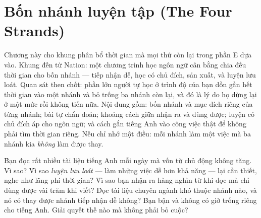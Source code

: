 \documentclass[../../english.tex]{subfiles}
\begin{document}
\chapter{Bốn nhánh luyện tập (The Four Strands)}

\begin{tomtat}
Chương này cho khung phân bổ thời gian mà mọi thứ còn lại trong phần E dựa vào. Khung đến từ Nation: một chương trình học ngôn ngữ cân bằng chia đều thời gian cho bốn nhánh --- tiếp nhận dễ, học có chủ đích, sản xuất, và luyện lưu loát. Quan sát then chốt: phần lớn người tự học ở trình độ của bạn dồn gần hết thời gian vào một nhánh và bỏ trống ba nhánh còn lại, và đó là lý do họ dừng lại ở một mức rồi không tiến nữa. Nội dung gồm: bốn nhánh và mục đích riêng của từng nhánh; bài tự chẩn đoán; khoảng cách giữa nhận ra và dùng được; luyện có chủ đích áp cho ngôn ngữ; và cách gắn tiếng Anh vào công việc thật để không phải tìm thời gian riêng. Nếu chỉ nhớ một điều: mỗi nhánh làm một việc mà ba nhánh kia \emph{không} làm được thay.
\end{tomtat}

\begin{nentang}
\end{nentang}

\begin{khoigoi}
\h{Bạn đọc rất nhiều tài liệu tiếng Anh mỗi ngày mà vốn từ chủ động không tăng. Vì sao?}
\h{Vì sao \emph{luyện lưu loát} --- làm những việc dễ hơn khả năng --- lại cần thiết, nghe như lãng phí thời gian?}
\h{Vì sao bạn nhận ra hàng nghìn từ khi đọc mà chỉ dùng được vài trăm khi viết?}
\h{Đọc tài liệu chuyên ngành khó thuộc nhánh nào, và nó có thay được nhánh tiếp nhận dễ không?}
\h{Bạn bận và không có giờ trống riêng cho tiếng Anh. Giải quyết thế nào mà không phải bỏ cuộc?}
\end{khoigoi}
\end{document}
